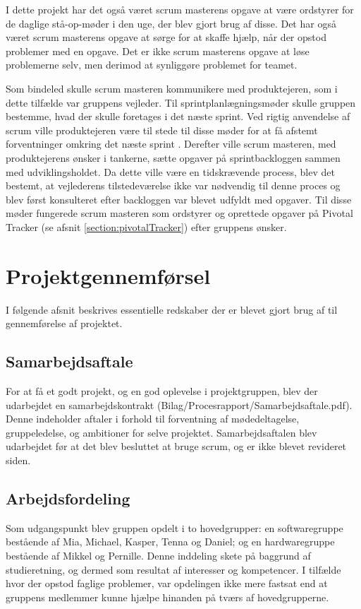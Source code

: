 \noindent I dette projekt har det også været scrum masterens opgave at være ordstyrer for de daglige stå-op-møder i den uge, der blev gjort brug af disse. Det har også været scrum masterens opgave at sørge for at skaffe hjælp, når der opstod problemer med en opgave. Det er ikke scrum masterens opgave at løse problemerne selv, men derimod at synliggøre problemet for teamet. \newline

\noindent Som bindeled skulle scrum masteren kommunikere med produktejeren, som i dette tilfælde var gruppens vejleder. Til sprintplanlægningsmøder skulle gruppen bestemme, hvad der skulle foretages i det næste sprint. Ved rigtig anvendelse af scrum ville produktejeren være til stede til disse møder for at få afstemt forventninger omkring det næste sprint \cite{scrumProductOwner}. Derefter ville scrum masteren, med produktejerens ønsker i tankerne, sætte opgaver på sprintbackloggen sammen med udviklingsholdet. Da dette ville være en tidskrævende process, blev det bestemt, at vejlederens tilstedeværelse ikke var nødvendig til denne proces og blev først konsulteret efter backloggen var blevet udfyldt med opgaver. Til disse møder fungerede scrum masteren som ordstyrer og oprettede opgaver på Pivotal Tracker (se afsnit \ref{section:pivotalTracker}) efter gruppens ønsker. 

\newpage
\chapter{Projektgennemførsel}
I følgende afsnit beskrives essentielle redskaber der er blevet gjort brug af til gennemførelse af projektet. 

\section{Samarbejdsaftale}
For at få et godt projekt, og en god oplevelse i projektgruppen, blev der udarbejdet en samarbejdskontrakt (Bilag/Procesrapport/Samarbejdsaftale.pdf). Denne indeholder aftaler i forhold til forventning af mødedeltagelse, gruppeledelse, og ambitioner for selve projektet. Samarbejdsaftalen blev udarbejdet før at det blev besluttet at bruge scrum, og er ikke blevet revideret siden.

\section{Arbejdsfordeling}
Som udgangspunkt blev gruppen opdelt i to hovedgrupper: en softwaregruppe bestående af Mia, Michael, Kasper, Tenna og Daniel; og en hardwaregruppe bestående af Mikkel og Pernille. Denne inddeling skete på baggrund af studieretning, og dermed som resultat af interesser og kompetencer. I tilfælde hvor der opstod faglige problemer, var opdelingen ikke mere fastsat end at gruppens medlemmer kunne hjælpe hinanden på tværs af hovedgrupperne.


